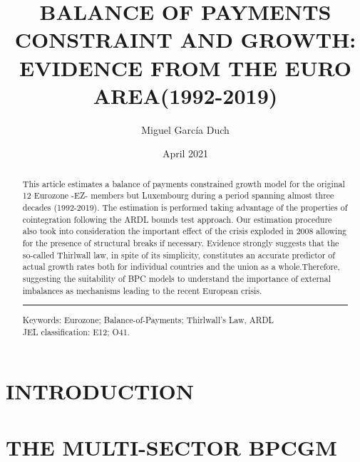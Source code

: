 \documentclass{article}
\title{BALANCE OF PAYMENTS CONSTRAINT AND GROWTH: EVIDENCE FROM THE EURO AREA(1992-2019)}
\author{Miguel García Duch}
\date{April 2021}
\begin{document}
\maketitle

\begin{abstract}
  This article estimates a balance of payments constrained growth model for the original 12 Eurozone -EZ- members but Luxembourg during a period spanning almost three decades (1992-2019). The estimation is performed taking advantage of the properties of cointegration following the ARDL bounds test approach. Our estimation procedure also took into consideration the important effect of the crisis exploded in 2008  allowing for the presence of structural breaks if necessary. Evidence strongly suggests that the so-called Thirlwall law, in spite of its simplicity, constitutes an accurate predictor of actual growth rates both for individual countries and the union as a whole.Therefore, suggesting the suitability of BPC models to understand the importance of external imbalances as mechanisms leading to the recent European crisis.
  \vspace{5mm} %
  \hrule
  \vspace{5mm} %

  Keywords: Eurozone; Balance-of-Payments; Thirlwall's Law, ARDL
  \vspace{3mm} %
  \\JEL classification: E12; O41.
\end{abstract}
\clearpage

\tableofcontents
\clearpage


\section{INTRODUCTION}



\section{THE MULTI-SECTOR BPCGM}
\end{document}
